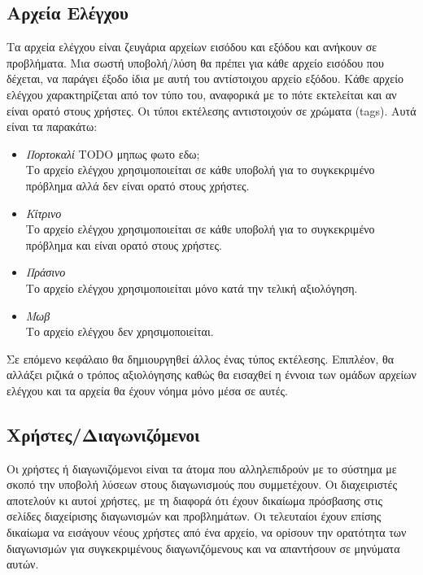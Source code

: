 \documentclass[diploma]{softlab-thesis}
\begin{document}
\subsection{Αρχεία Ελέγχου}

Τα αρχεία ελέγχου είναι ζευγάρια αρχείων εισόδου και εξόδου και ανήκουν σε
προβλήματα. Μια σωστή υποβολή/λύση θα πρέπει για κάθε αρχείο εισόδου
που δέχεται, να παράγει έξοδο ίδια με αυτή του αντίστοιχου αρχείο εξόδου.
Κάθε αρχείο ελέγχου χαρακτηρίζεται από τον τύπο του, αναφορικά με το πότε
εκτελείται και αν είναι ορατό στους χρήστες. Οι τύποι εκτέλεσης αντιστοιχούν
σε χρώματα (tags). Αυτά είναι τα παρακάτω:

\begin{itemize}
  \item \textit{Πορτοκαλί} TODO μηπως φωτο εδω; \\
      Το αρχείο ελέγχου χρησιμοποιείται σε κάθε υποβολή για το συγκεκριμένο πρόβλημα
      αλλά δεν είναι ορατό στους χρήστες.
    \item \textit{Κίτρινο} \\
      Το αρχείο ελέγχου χρησιμοποιείται σε κάθε υποβολή για το συγκεκριμένο πρόβλημα
      και είναι ορατό στους χρήστες.
    \item \textit{Πράσινο} \\
      Το αρχείο ελέγχου χρησιμοποιείται μόνο κατά την τελική αξιολόγηση.
    \item \textit{Μωβ} \\
      Το αρχείο ελέγχου δεν χρησιμοποιείται.
\end{itemize}

Σε επόμενο κεφάλαιο θα δημιουργηθεί άλλος ένας τύπος εκτέλεσης. Επιπλέον, θα
αλλάξει ριζικά ο τρόπος αξιολόγησης καθώς θα εισαχθεί η έννοια των ομάδων
αρχείων ελέγχου και τα αρχεία θα έχουν νόημα μόνο μέσα σε αυτές.


\subsection{Χρήστες/Διαγωνιζόμενοι}

Οι χρήστες ή διαγωνιζόμενοι είναι τα άτομα που αλληλεπιδρούν με το σύστημα με
σκοπό την υποβολή λύσεων στους διαγωνισμούς που συμμετέχουν. Οι διαχειριστές
αποτελούν κι αυτοί χρήστες, με τη διαφορά ότι έχουν δικαίωμα πρόσβασης στις
σελίδες διαχείρισης διαγωνισμών και προβλημάτων. Οι τελευταίοι έχουν επίσης
δικαίωμα να εισάγουν νέους χρήστες από ένα αρχείο, να ορίσουν την ορατότητα των
διαγωνισμών για συγκεκριμένους διαγωνιζόμενους και να απαντήσουν σε μηνύματα
αυτών.
\end{document}
